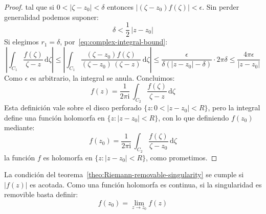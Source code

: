 \begin{proof}
    tal que si \(0 < \lvert \zeta - z_0 \rvert < \delta\)
    entonces \(\lvert (\zeta - z_0) f(\zeta) \rvert < \epsilon\).
    Sin perder generalidad podemos suponer:
    \begin{equation*}
      \delta < \frac{1}{2} \, \lvert z - z_0 \rvert
    \end{equation*}
    Si elegimos \(r_1 = \delta\),
    por~\eqref{eq:complex-integral-bound}:
    \begin{equation*}
      \left\lvert
	\int_{C_1} \frac{f(\zeta)}{\zeta - z} \, \mathrm{d} \zeta
      \right\rvert
	\le \left\lvert
	      \int_{C_1} \frac{(\zeta - z_0) f(\zeta)}
			      {(\zeta - z_0) \, (\zeta - z)}
			 \, \mathrm{d} \zeta
	    \right\rvert
	\le \frac{\epsilon}
		 {\delta ( \lvert z - z_0 \rvert - \delta )}
	      \cdot 2 \pi \delta
	\le \frac{4 \pi \epsilon}{\lvert z - z_0 \rvert}
    \end{equation*}
    Como \(\epsilon\) es arbitrario,
    la integral se anula.
    Concluimos:
    \begin{equation*}
      f(z)
	= \frac{1}{2 \pi \mathrm{i}} \,
	    \int_{C_2} \frac{f(\zeta)}{\zeta - z}
	      \, \mathrm{d} \zeta
    \end{equation*}
    Esta definición vale sobre el disco perforado
    \(\{ z  \colon 0 < \lvert z - z_0 \rvert < R \}\),
    pero la integral define una función holomorfa
    en \(\{z \colon \lvert z - z_0 \rvert < R \}\),
    con lo que definiendo \(f(z_0)\) mediante:
    \begin{equation*}
      f(z_0)
	= \frac{1}{2 \pi \mathrm{i}} \,
	    \int_{C_2} \frac{f(\zeta)}{\zeta - z_0}
	      \, \mathrm{d} \zeta
    \end{equation*}
    la función \(f\) es holomorfa
    en \(\{z \colon \lvert z - z_0 \rvert < R \}\),
    como prometimos.
  \end{proof}
  La condición del teorema~\ref{theo:Riemann-removable-singularity}
  se cumple si \(\lvert f(z) \rvert\) es acotada.
  Como una función holomorfa es continua,
  si la singularidad es removible basta definir:
  \begin{equation*}
    f(z_0)
      = \lim_{z \rightarrow z_0} f(z)
  \end{equation*}

